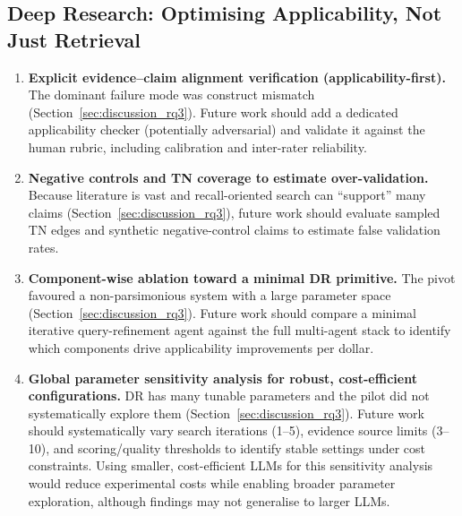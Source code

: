 \subsection{Deep Research: Optimising Applicability, Not Just Retrieval}
\begin{enumerate}[noitemsep]
    \item \textbf{Explicit evidence--claim alignment verification (applicability-first).} The dominant failure mode was construct mismatch (Section~\ref{sec:discussion_rq3}). Future work should add a dedicated applicability checker (potentially adversarial) and validate it against the human rubric, including calibration and inter-rater reliability.
    \item \textbf{Negative controls and TN coverage to estimate over-validation.} Because literature is vast and recall-oriented search can ``support'' many claims (Section~\ref{sec:discussion_rq3}), future work should evaluate sampled TN edges and synthetic negative-control claims to estimate false validation rates.
    \item \textbf{Component-wise ablation toward a minimal DR primitive.} The pivot favoured a non-parsimonious system with a large parameter space (Section~\ref{sec:discussion_rq3}). Future work should compare a minimal iterative query-refinement agent against the full multi-agent stack to identify which components drive applicability improvements per dollar.
    \item \textbf{Global parameter sensitivity analysis for robust, cost-efficient configurations.} DR has many tunable parameters and the pilot did not systematically explore them (Section~\ref{sec:discussion_rq3}). Future work should systematically vary search iterations (1--5), evidence source limits (3--10), and scoring/quality thresholds to identify stable settings under cost constraints. Using smaller, cost-efficient LLMs for this sensitivity analysis would reduce experimental costs while enabling broader parameter exploration, although findings may not generalise to larger LLMs.
\end{enumerate}

